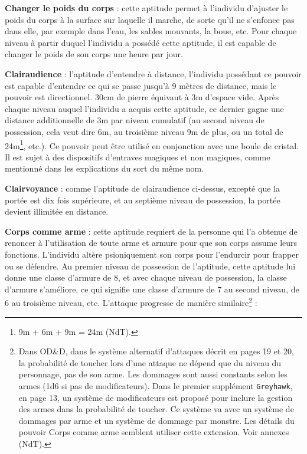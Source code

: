 \documentclass[11pt]{article}
\begin{document}
{\textbf{Changer le poids du corps} : cette aptitude permet à l'individu d'ajuster le poids du corps à la surface sur laquelle il marche, de sorte qu'il ne s'enfonce pas dans elle, par exemple dans l'eau, les sables mouvants, la boue, etc. Pour chaque niveau à partir duquel l'individu a possédé cette aptitude, il est capable de changer le poids de son corps une heure par jour.

\bigskip

\textbf{Clairaudience} : l'aptitude d'entendre à distance, l'individu possédant ce pouvoir est capable d'entendre ce qui se passe jusqu'à 9 mètres de distance, mais le pouvoir est directionnel. 30cm de pierre équivaut à 3m d'espace vide. Après chaque niveau auquel l'individu a acquis cette aptitude, ce dernier gagne une distance additionnelle de 3m par niveau cumulatif (au second niveau de possession, cela veut dire 6m, au troisième niveau 9m de plus, ou un total de 24m\footnote{9m + 6m + 9m = 24m (NdT).}, etc.). Ce pouvoir peut être utilisé en conjonction avec une boule de cristal. Il est sujet à des dispositifs d'entraves magiques et non magiques, comme mentionné dans les explications du sort du même nom.

\bigskip

\textbf{Clairvoyance} : comme l'aptitude de clairaudience ci-dessus, excepté que la portée est dix fois supérieure, et au septième niveau de possession, la portée devient illimitée en distance.

\bigskip

\textbf{Corps comme arme} : cette aptitude requiert de la personne qui l'a obtenue de renoncer à l'utilisation de toute arme et armure pour que son corps assume leurs fonctions. L'individu altère psioniquement son corps pour l'endurcir pour frapper ou se défendre. Au premier niveau de possession de l'aptitude, cette aptitude lui donne une classe d'armure de 8, et avec chaque niveau de possession, la classe d'armure s'améliore, ce qui signifie une classe d'armure de 7 au second niveau, de 6 au troisième niveau, etc. L'attaque progresse de manière similaire\footnote{Dans OD\&D, dans le système alternatif d'attaques décrit en pages 19 et 20, la probabilité de toucher lors d'une attaque ne dépend que du niveau du personnage, pas de son arme. Les dommages sont aussi constants selon les armes (1d6 si pas de modificateurs). Dans le premier supplément \texttt{Greyhawk}, en page 13, un système de modificateurs est proposé pour inclure la gestion des armes dans la probabilité de toucher. Ce système va avec un système de dommages par arme et un système de dommage par monstre. Les détails du pouvoir Corps comme arme semblent utiliser cette extension. Voir annexes (NdT). } :

}
\end{document}
